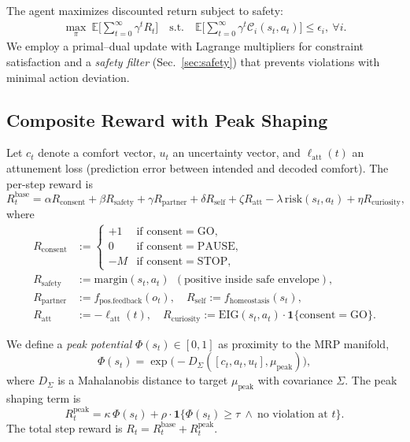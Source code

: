 \documentclass[12pt]{article}
\begin{document}
The agent maximizes discounted return subject to safety:
\begin{align}
\max_{\pi} \ \mathbb{E}\Big[\sum_{t=0}^{\infty}\gamma^t R_t \Big]
\quad \text{s.t.} \quad
\mathbb{E}\Big[\sum_{t=0}^{\infty}\gamma^t \mathcal{C}_i(s_t,a_t)\Big] \le \epsilon_i,\ \forall i.
\end{align}
We employ a primal--dual update with Lagrange multipliers for constraint satisfaction and a \emph{safety filter} (Sec.~\ref{sec:safety}) that prevents violations with minimal action deviation.

\subsection{Composite Reward with Peak Shaping}
Let $c_t$ denote a comfort vector, $u_t$ an uncertainty vector, and $\ell_{\text{att}}(t)$ an attunement loss (prediction error between intended and decoded comfort).
The per-step reward is
\begin{equation}
\label{eq:baseR}
R_t^{\text{base}} = \alpha R_{\text{consent}} + \beta R_{\text{safety}} + \gamma R_{\text{partner}} + \delta R_{\text{self}} + \zeta R_{\text{att}} - \lambda \,\text{risk}(s_t,a_t) + \eta R_{\text{curiosity}},
\end{equation}
where
\begin{align*}
R_{\text{consent}} &:= \begin{cases}
+1 & \text{if } \text{consent}=\text{GO},\\
0 & \text{if } \text{consent}=\text{PAUSE},\\
- M & \text{if } \text{consent}=\text{STOP},
\end{cases} \\
R_{\text{safety}} &:= \text{margin}(s_t,a_t) \ \ (\text{positive inside safe envelope}),\\
R_{\text{partner}} &:= f_{\text{pos.feedback}}(o_t), \quad 
R_{\text{self}} := f_{\text{homeostasis}}(s_t),\\
R_{\text{att}} &:= -\ell_{\text{att}}(t), \quad
R_{\text{curiosity}} := \text{EIG}(s_t,a_t) \cdot \mathbf{1}\{\text{consent}=\text{GO}\}.
\end{align*}

We define a \emph{peak potential} $\Phi(s_t)\in[0,1]$ as proximity to the MRP manifold,
\begin{equation}
\label{eq:phi}
\Phi(s_t) = \exp\!\Big(- D_{\Sigma}([c_t,a_t,u_t], \mu_{\text{peak}})\Big),
\end{equation}
where $D_{\Sigma}$ is a Mahalanobis distance to target $\mu_{\text{peak}}$ with covariance $\Sigma$. The peak shaping term is
\begin{equation}
R_t^{\text{peak}} = \kappa \,\Phi(s_t) + \rho \cdot \mathbf{1}\{\Phi(s_t)\ge \tau \ \wedge \ \text{no violation at } t\}.
\end{equation}
The total step reward is $R_t = R_t^{\text{base}} + R_t^{\text{peak}}$.
\end{document}
